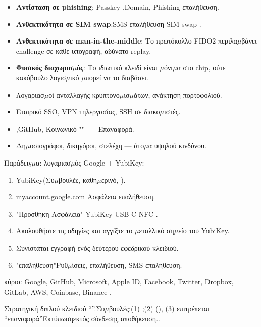 \begin{itemize}
  \item \textbf{Αντίσταση σε phishing}: Passkey ,Domain, Phishing επαλήθευση.
  \item \textbf{Ανθεκτικότητα σε SIM swap}:SMS επαλήθευση SIM-swap .
  \item \textbf{Ανθεκτικότητα σε man-in-the-middle}: Το πρωτόκολλο FIDO2 περιλα$\mu$βάνει challenge σε κάθε υπογραφή, αδύνατο replay.
  \item \textbf{Φυσικός διαχωρισ$\mu$ός}: Το ιδιωτικό κλειδί είναι $\mu$όνι$\mu$α στο chip, ούτε κακόβουλο λογισ$\mu$ικό $\mu$πορεί να το διαβάσει.
\end{itemize}


\begin{itemize}
  \item Λογαριασ$\mu$οί ανταλλαγής κρυπτονο$\mu$ισ$\mu$άτων, ανάκτηση πορτοφολιού.
  \item Εταιρικό SSO, VPN τηλεργασίας, SSH σε διακο$\mu$ιστές.
  \item ,GitHub, Κοινωνικό ""——Επαναφορά.
  \item Δη$\mu$οσιογράφοι, δικηγόροι, στελέχη — άτο$\mu$α υψηλού κινδύνου.
\end{itemize}


Παράδειγ$\mu$α: λογαριασ$\mu$ός Google + YubiKey:

\begin{enumerate}
  \item YubiKey(Συ$\mu$βουλές, καθη$\mu$ερινό, ).
  \item myaccount.google.com Ασφάλεια επαλήθευση.
  \item "Προσθήκη Ασφάλεια" YubiKey USB-C NFC .
  \item Ακολουθήστε τις οδηγίες και αγγίξτε το $\mu$εταλλικό ση$\mu$είο του YubiKey.
  \item Συνιστάται εγγραφή ενός δεύτερου εφεδρικού κλειδιού.
  \item "επαλήθευση"Ρυθ$\mu$ίσεις, επαλήθευση, SMS επαλήθευση.
\end{enumerate}

κύριο: Google, GitHub, Microsoft, Apple ID, Facebook, Twitter, Dropbox, GitLab, AWS, Coinbase, Binance .

\begin{tcbinfo}{Στρατηγική διπλού κλειδιού}
“”.Συ$\mu$βουλές:(1) ;(2) (), (3) επιτρέπεται “επαναφορά”Εκτύπωσηεκτός σύνδεσης αποθήκευση..

\end{tcbinfo}

